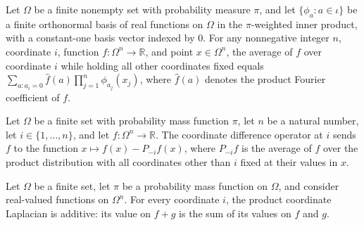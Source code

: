 \begin{theorem}
\label{FABL.FiniteFourierBasis.coordinateProjection_fourier_expansion}
\leanok
{}
Let $\Omega$ be a finite nonempty set with probability measure $\pi$, and let
$\{\phi_a:a\in\iota\}$ be a finite orthonormal basis of real functions on $\Omega$ in
the $\pi$-weighted inner product, with a constant-one basis vector indexed by $0$. For
any nonnegative integer $n$, coordinate $i$, function $f:\Omega^n\to\mathbb R$, and
point $x\in\Omega^n$, the average of $f$ over coordinate $i$ while holding all other
coordinates fixed equals $\sum_{a:a_i=0}\widehat f(a)\prod_{j=1}^n\phi_{a_j}(x_j)$,
where $\widehat f(a)$ denotes the product Fourier coefficient of $f$.
\end{theorem}

\begin{definition}
\label{FABL.productCoordinateLaplacian}
\leanok
{}
Let $\Omega$ be a finite set with probability mass function $\pi$, let $n$ be a natural
number, let $i\in\{1,\ldots,n\}$, and let $f:\Omega^n\to\mathbb R$. The coordinate
difference operator at $i$ sends $f$ to the function $x\mapsto f(x)-P_{-i}f(x)$, where
$P_{-i}f$ is the average of $f$ over the product distribution with all coordinates other
than $i$ fixed at their values in $x$.
\end{definition}

\begin{theorem}
\label{FABL.productCoordinateLaplacian_add}
\leanok
{}
Let $\Omega$ be a finite set, let $\pi$ be a probability mass function on $\Omega$, and
consider real-valued functions on $\Omega^n$. For every coordinate $i$, the product
coordinate Laplacian is additive: its value on $f+g$ is the sum of its values on $f$ and
$g$.
\end{theorem}

